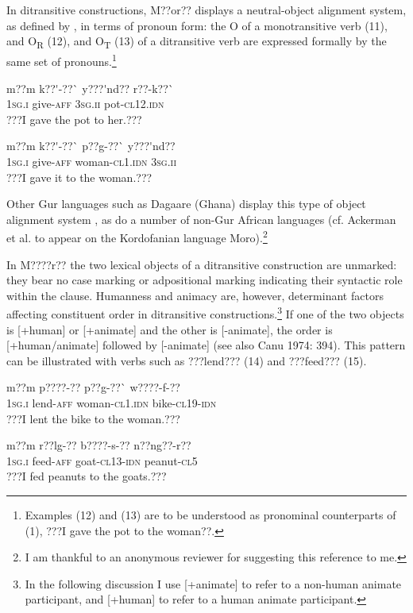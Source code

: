 \documentclass[output=paper]{langsci/langscibook}
\begin{document}
In ditransitive constructions, M??or?? displays a neutral-object alignment system, as defined by \citet{MalchukovEtAl2010}, in terms of pronoun form: the O of a monotransitive verb (11), and O\textsubscript{R} (12), and O\textsubscript{T} (13) of a ditransitive verb are expressed formally by the same set of pronouns.\footnote{{ }Examples (12) and (13) are to be understood as pronominal counterparts of (1), ???I gave the pot to the woman??.  } 

\ea 
\gll  m??m    k??\'{ }-??\`{ }      y???\'{ }nd??    r??-k??\`{ } \\
%
\textsc{1sg.i  }  give-\textsc{aff}    \textsc{3sg.ii  }  pot\textsc{{}-cl12.idn}\\
\glt
???I gave the pot to her.???
\z

\ea 
\gll  m??m    k??\'{ }-??\`{ }    p??g-??\`{ }      y???\'{ }nd??\\
%
\textsc{1sg.i  }  give-\textsc{aff}  woman-\textsc{cl1.idn}  \textsc{3sg.ii}
\\\glt
???I gave it to the woman.???
\z

Other Gur languages such as Dagaare (Ghana) display this type of object alignment system \citep{Bodomo1997}, as do a number of non-Gur African languages (cf. Ackerman et al. to appear on the Kordofanian language Moro).\footnote{ I am thankful to an anonymous reviewer for suggesting this reference to me.  }{ }


In M????r?? the two lexical objects of a ditransitive construction are unmarked: they bear no case marking or adpositional marking indicating their syntactic role within the clause. Humanness and animacy are, however, determinant factors affecting constituent order in ditransitive constructions.\footnote{ In the following discussion I use [+animate] to refer to a non-human animate participant, and [+human] to refer to a human animate participant.}{ }If one of the two objects is [+human] or [+animate] and the other is [-animate], the order is [+human/animate] followed by [-animate] (see also Canu 1974: 394). This pattern can be illustrated with verbs such as ???lend??? (14) and ???feed??? (15).

\ea \gll 
\label{bkm:Ref424142726}m??m    p????-??         p??g-??\`{ }      w????-f-??
\\
%
\textsc{1sg.i  }  lend-\textsc{aff}        woman-\textsc{cl1.idn}  bike-\textsc{cl19-idn}
\\\glt
???I lent the bike to the woman.???
\z

\ea \gll 
\label{bkm:Ref424142734}m??m    r??lg-??      b????-s-??    n??ng??-r??
\\
%
\textsc{1sg.i  }  feed-\textsc{aff}    goat-\textsc{cl13-idn}  peanut-\textsc{cl5}
\\\glt
???I fed peanuts to the goats.???
\z
\end{document}

